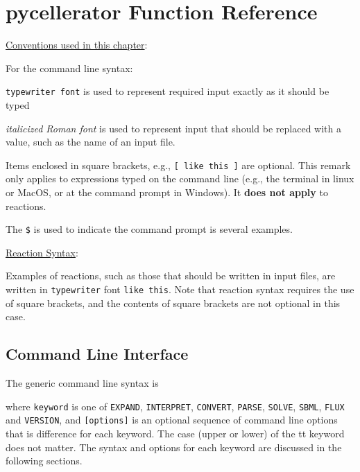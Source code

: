 \chapter[Functions]{pycellerator Function Reference}

\underline{Conventions used in this chapter}: 

For the command line syntax:

{\tt typewriter font} is used to represent required input exactly as it should be typed

\textit{italicized Roman font} is used to represent input that should be replaced with a value, such as the name of an input file.

Items enclosed in square brackets, e.g., {\tt [ like this ]} are optional. This remark only applies to expressions typed on the command line (e.g., the terminal in linux or MacOS, or at the command prompt in Windows). It \textbf{does not apply} to reactions.

The {\tt \$} is used to indicate the command prompt is several examples. 

\underline{Reaction Syntax}: 

Examples of reactions, such as those that should be written in input files, are written in {\tt typewriter} font {\tt like this}. Note that reaction syntax requires the 
use of square brackets, and the contents of square brackets are not optional in this case. 

\section{Command Line Interface}

The generic command line syntax is


where {\tt keyword} is one of {\tt EXPAND}, {\tt INTERPRET}, {\tt CONVERT}, {\tt PARSE}, {\tt SOLVE}, {\tt SBML}, {\tt FLUX} and {\tt VERSION}, and {\tt [options]} is an optional sequence of command line options that is difference for each keyword. The case (upper or lower) of the {tt keyword} does not matter. The syntax and options for each keyword are discussed in the following sections. 
 
